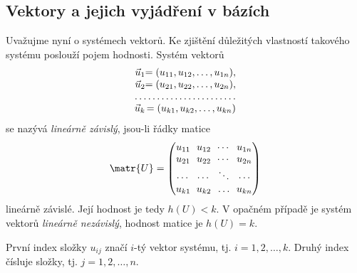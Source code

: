     \subsection{Vektory a jejich vyjádření v bázích}\label{mai:IchapIIsecIVsubI}
      Uvažujme nyní o systémech vektorů. Ke zjištění důležitých vlastností takového systému poslouží
      pojem hodnosti. Systém vektorů
      \[
        \renewcommand{\arraycolsep}{0pt}%
        \begin{array}{rr}
          \vec{u}_1 &= (u_{11}, u_{12}, \ldots, u_{1n}),   \\
          \vec{u}_2 &= (u_{21}, u_{22}, \ldots, u_{2n}),   \\
          \hdotsfor{2} \\
          \vec{u}_k &= (u_{k1}, u_{k2}, \ldots, u_{kn})
        \end{array}
      \]
      se nazývá \emph{lineárně závislý}, jsou-li řádky matice
      \begingroup
        \renewcommand\arraystretch{0.9}
        \renewcommand\arraycolsep{3pt}
        \begin{equation*}
          \matr{U}=
          \begin{pmatrix}
            u_{11} & u_{12} & \cdots & u_{1n}    \\
            u_{21} & u_{22} & \cdots & u_{2n}    \\
            \cdots & \cdots & \ddots & \cdots    \\
            u_{k1} & u_{k2} & \ldots & u_{kn}
          \end{pmatrix}
        \end{equation*}
      \endgroup
      lineárně závislé. Její hodnost je tedy \(h(U) < k\). V opačném případě je systém vektorů
      \emph{lineárně nezávislý}, hodnost matice je \(h(U) = k\).
        
      \begin{note}
        První index složky \(u_{ij}\) značí \(i\)-tý vektor systému, tj. \(i = 1, 2, \ldots, k\).
        Druhý index čísluje složky, tj. \(j = 1, 2, \ldots, n\).
      \end{note}

